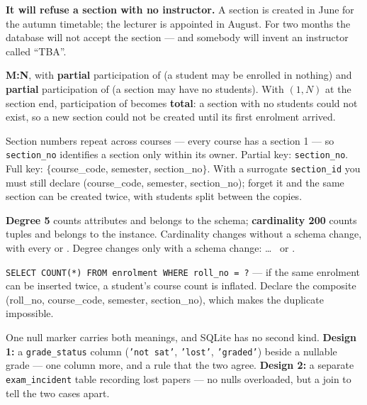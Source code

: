 \begin{ans}
  \item \textbf{It will refuse a section with no instructor.} A section is
        created in June for the autumn timetable; the lecturer is appointed in
        August. For two months the database will not accept the section ---
        and somebody will invent an instructor called ``TBA''.
  \item \textbf{M:N}, with \textbf{partial} participation of 
        (a student may be enrolled in nothing) and \textbf{partial}
        participation of  (a section may have no students). With
        $(1,N)$ at the section end, participation of  becomes
        \textbf{total}: a section with no students could not exist, so a new
        section could not be created until its first enrolment arrived.
  \item Section numbers repeat across courses --- every course has a section
        1 --- so \texttt{section\_no} identifies a section only within its
        owner. Partial key: \texttt{section\_no}. Full key: $\{$course\_code,
        semester, section\_no$\}$. With a surrogate \texttt{section\_id} you
        must still declare  (course\_code, semester,
        section\_no); forget it and the same section can be created twice,
        with students split between the copies.
\end{ans}

\begin{ans}
  \item \textbf{Degree 5} counts attributes and belongs to the schema;
        \textbf{cardinality 200} counts tuples and belongs to the instance.
        Cardinality changes without a schema change, with every
         or . Degree changes only with a schema
        change:  \dots\  or .
  \item \texttt{SELECT COUNT(*) FROM enrolment WHERE roll\_no = ?} --- if the
        same enrolment can be inserted twice, a student's course count is
        inflated. Declare the composite  (roll\_no,
        course\_code, semester, section\_no), which makes the duplicate
        impossible.
  \item One null marker carries both meanings, and SQLite has no second kind.
        \textbf{Design 1:} a \texttt{grade\_status} column (\texttt{'not sat'},
        \texttt{'lost'}, \texttt{'graded'}) beside a nullable grade --- one
        column more, and a rule that the two agree. \textbf{Design 2:} a
        separate \texttt{exam\_incident} table recording lost papers --- no
        nulls overloaded, but a join to tell the two cases apart.
\end{ans}

